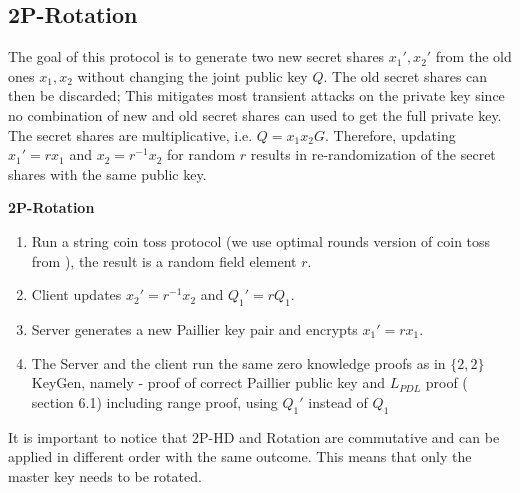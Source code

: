 \documentclass[runningheads]{llncs}
\begin{document}
{{\subsection{2P-Rotation}  
The goal of this protocol is to generate two new secret shares $x_1', x_2'$ from the old ones $x_1,x_2$ without changing the joint public key $Q$. The old secret shares can then be discarded; This mitigates most transient attacks on the private key since no combination of new and old secret shares can used to get the full private key. The secret shares are multiplicative, i.e. $Q=x_1x_2G$. Therefore, updating $x_1' = rx_1$ and $x_2 = r^{-1}x_2$ for random $r$ results in re-randomization of the secret shares with the same public key.
\begin{mdframed}[userdefinedwidth = 12.3cm]
\textbf{2P-Rotation}
\begin{enumerate}

\item Run a string coin toss protocol (we use optimal rounds version of coin toss from \cite{simulate}), the result is a random field element $r$.
\item Client updates $x_2' = r^{-1}x_2$ and $Q_1' = rQ_1$. 
\item Server generates a new Paillier key pair and encrypts $x_1' = rx_1$. 
\item The Server and the client run the same zero knowledge proofs as in $\{2,2\}$ KeyGen, namely - proof of correct Paillier public key and $L_{PDL}$ proof (\cite{lindell17} section 6.1) including range proof, using $Q_1'$ instead of $Q_1$
\end{enumerate}
\end{mdframed}
It is important to notice that 2P-HD and Rotation are commutative and can be applied in different order with the same outcome. This means that only the master key needs to be rotated. 
}}
\end{document}
